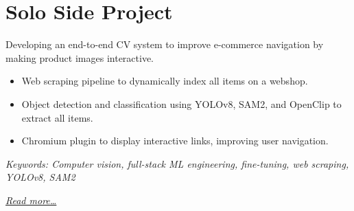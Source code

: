 \section{Solo Side Project}
Developing an end-to-end CV system to improve e-commerce navigation by making product images interactive.

\begin{itemize}
  \item Web scraping pipeline to dynamically index all items on a webshop.
  \item Object detection and classification using YOLOv8, SAM2, and OpenClip to extract all items.
  \item Chromium plugin to display interactive links, improving user navigation.
\end{itemize}

{\footnotesize\textit{Keywords: Computer vision, full-stack ML engineering, fine-tuning, web scraping, YOLOv8, SAM2}}

\hfill{\small{\textit{\hyperref[sec:iris]{Read more…}}}}

